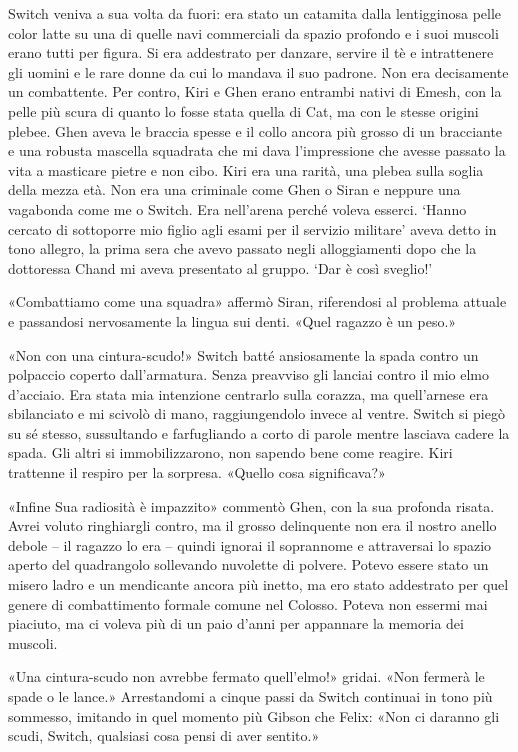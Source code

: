 Switch veniva a sua volta da fuori: era stato un catamita dalla
lentigginosa pelle color latte su una di quelle navi commerciali da
spazio profondo e i suoi muscoli erano tutti per figura. Si era
addestrato per danzare, servire il tè e intrattenere gli uomini e le
rare donne da cui lo mandava il suo padrone. Non era decisamente un
combattente. Per contro, Kiri e Ghen erano entrambi nativi di Emesh, con
la pelle più scura di quanto lo fosse stata quella di Cat, ma con le
stesse origini plebee. Ghen aveva le braccia spesse e il collo ancora
più grosso di un bracciante e una robusta mascella squadrata che mi dava
l'impressione che avesse passato la vita a masticare pietre e non cibo.
Kiri era una rarità, una plebea sulla soglia della mezza età. Non era
una criminale come Ghen o Siran e neppure una vagabonda come me o
Switch. Era nell'arena perché voleva esserci. `Hanno cercato di
sottoporre mio figlio agli esami per il servizio militare' aveva detto
in tono allegro, la prima sera che avevo passato negli alloggiamenti
dopo che la dottoressa Chand mi aveva presentato al gruppo. `Dar è così
sveglio!'

«Combattiamo come una squadra» affermò Siran, riferendosi al problema
attuale e passandosi nervosamente la lingua sui denti. «Quel ragazzo è
un peso.»

«Non con una cintura-scudo!» Switch batté ansiosamente la spada contro
un polpaccio coperto dall'armatura. Senza preavviso gli lanciai contro
il mio elmo d'acciaio. Era stata mia intenzione centrarlo sulla corazza,
ma quell'arnese era sbilanciato e mi scivolò di mano, raggiungendolo
invece al ventre. Switch si piegò su sé stesso, sussultando e
farfugliando a corto di parole mentre lasciava cadere la spada. Gli
altri si immobilizzarono, non sapendo bene come reagire. Kiri trattenne
il respiro per la sorpresa. «Quello cosa significava?»

«Infine Sua radiosità è impazzito» commentò Ghen, con la sua profonda
risata. Avrei voluto ringhiargli contro, ma il grosso delinquente non
era il nostro anello debole -- il ragazzo lo era -- quindi ignorai il
soprannome e attraversai lo spazio aperto del quadrangolo sollevando
nuvolette di polvere. Potevo essere stato un misero ladro e un
mendicante ancora più inetto, ma ero stato addestrato per quel genere di
combattimento formale comune nel Colosso. Poteva non essermi mai
piaciuto, ma ci voleva più di un paio d'anni per appannare la memoria
dei muscoli.

«Una cintura-scudo non avrebbe fermato quell'elmo!» gridai. «Non fermerà
le spade o le lance.» Arrestandomi a cinque passi da Switch continuai in
tono più sommesso, imitando in quel momento più Gibson che Felix: «Non
ci daranno gli scudi, Switch, qualsiasi cosa pensi di aver sentito.»

